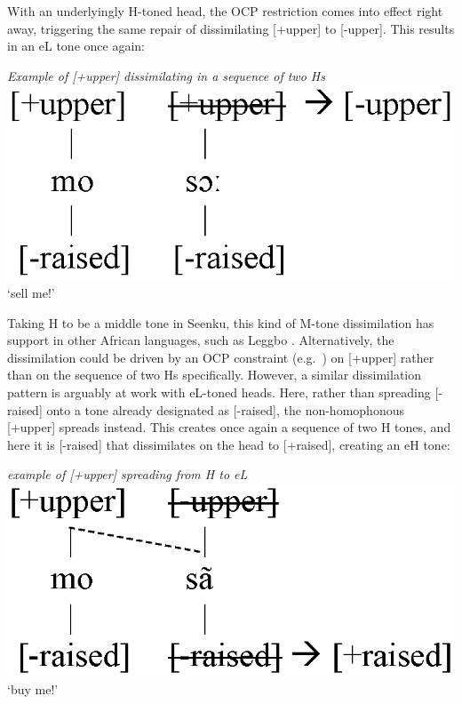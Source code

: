 \documentclass[output=paper]{langsci/langscibook}
\begin{document}
With an underlyingly H-toned head, the OCP restriction comes into effect right away, triggering the same repair of dissimilating [+upper] to [-upper]. This results in an eL tone once again:

\ea\label{ex:mcpherson:24} {\it Example of [+upper] dissimilating in a sequence of two Hs} \\
\includegraphics[scale=.6]{figures/MspreadM.eps} \\
`sell me!' \\
\z

Taking H to be a middle tone in Seenku, this kind of M-tone dissimilation has support in other African languages, such as Leggbo \citep{Paster03}. Alternatively, the dissimilation could be driven by an OCP constraint (e.g.\ \citealt{McCarthy86}) on [+upper] rather than on the sequence of two Hs specifically. However, a similar dissimilation pattern is arguably at work with eL-toned heads. Here, rather than spreading [-raised] onto a tone already designated as [-raised], the non-homophonous [+upper] spreads instead. This creates once again a sequence of two H tones, and here it is [-raised] that dissimilates on the head to [+raised], creating an eH tone:

\ea\label{ex:mcpherson:25} {\it example of [+upper] spreading from H to eL} \\
\includegraphics[scale=.58]{figures/MspreadL.eps} \\
`buy me!' \\
\z
\end{document}
